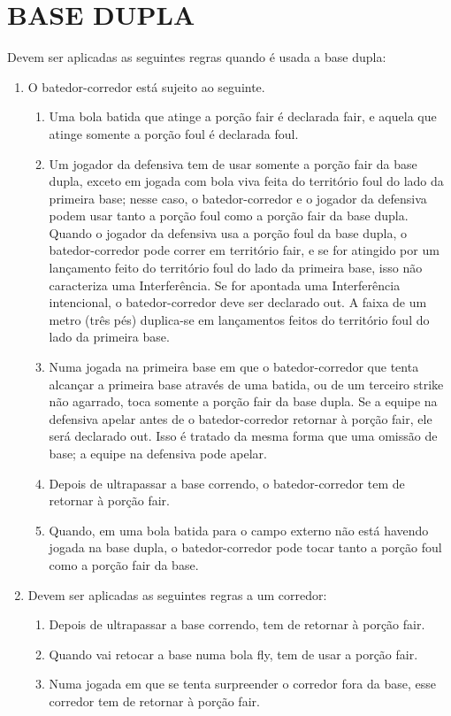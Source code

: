 \section{BASE DUPLA} 
\begin{multicols}{2}
	Devem ser aplicadas as seguintes regras quando \'e usada a base dupla: 
	
	\begin{enumerate}[label=\alph*)]
		\item O batedor-corredor est\'a sujeito ao seguinte. 
		\begin{enumerate}[label=\roman*.]
			\item Uma bola batida que atinge a por\c{c}\~ao \gls{fair} \'e declarada \gls{fair}, e aquela que atinge somente a por\c{c}\~ao \gls{foul} \'e declarada \gls{foul}. 
			\item Um jogador da defensiva tem de usar somente a por\c{c}\~ao \gls{fair} da base dupla, exceto em jogada com bola viva feita do territ\'orio \gls{foul} do lado da primeira base; nesse caso, o batedor-corredor e o jogador da defensiva podem usar tanto a por\c{c}\~ao \gls{foul} como a por\c{c}\~ao \gls{fair} da base dupla. Quando o jogador da defensiva usa a por\c{c}\~ao \gls{foul} da base dupla, o batedor-corredor pode correr em territ\'orio \gls{fair}, e se for atingido por um lan\c{c}amento feito do territ\'orio \gls{foul} do lado da primeira base, isso n\~ao caracteriza uma Interfer\^encia. Se for apontada uma Interfer\^encia intencional, o batedor-corredor deve ser declarado \gls{out}. A faixa de um metro (tr\^es p\'es) duplica-se em lan\c{c}amentos feitos do territ\'orio \gls{foul} do lado da primeira base. 
			\item Numa jogada na primeira base em que o batedor-corredor que tenta alcan\c{c}ar a primeira base atrav\'es de uma batida, ou de um terceiro \gls{strike} n\~ao agarrado, toca somente a por\c{c}\~ao \gls{fair} da base dupla. Se a equipe na defensiva apelar antes de o batedor-corredor retornar \`a por\c{c}\~ao \gls{fair}, ele ser\'a declarado \gls{out}. Isso \'e tratado da mesma forma que uma omiss\~ao de base; a equipe na defensiva pode apelar. 
			\item Depois de ultrapassar a base correndo, o batedor-corredor tem de retornar \`a por\c{c}\~ao \gls{fair}. 
			\item Quando, em uma bola batida para o campo externo n\~ao est\'a havendo jogada na base dupla, o batedor-corredor pode tocar tanto a por\c{c}\~ao \gls{foul} como a por\c{c}\~ao \gls{fair} da base. 
		\end{enumerate}
		\item Devem ser aplicadas as seguintes regras a um corredor: 
		\begin{enumerate}[label=\roman*)]
			\item Depois de ultrapassar a base correndo, tem de retornar \`a por\c{c}\~ao \gls{fair}. 
			\item Quando vai retocar a base numa bola \gls{fly}, tem de usar a por\c{c}\~ao \gls{fair}. 
			\item Numa jogada em que se tenta surpreender o corredor fora da base, esse corredor tem de retornar \`a por\c{c}\~ao \gls{fair}. 
			

\end{enumerate}
\end{enumerate}
\end{multicols}
